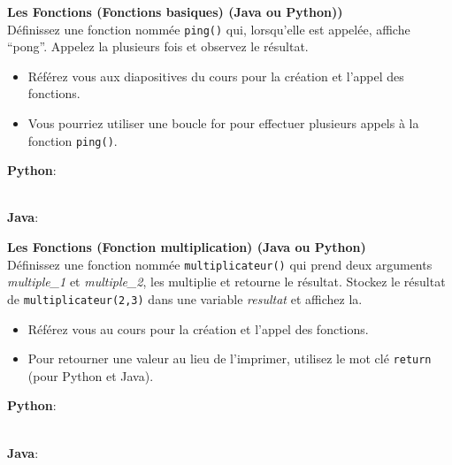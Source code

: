\begin{Exercice}[5 minutes] \textbf{Les Fonctions (Fonctions basiques) (Java ou Python))}\\
  Définissez une fonction nommée \lstinline{ping()} qui, lorsqu'elle est appelée, affiche ``pong''. Appelez la plusieurs fois et observez le résultat.  \\
   
    \begin{conseil}
        \begin{itemize}
            \item Référez vous aux diapositives du cours pour la création et l'appel des fonctions. 
            \item Vous pourriez utiliser une boucle for pour effectuer plusieurs appels à la fonction \lstinline{ping()}.
        \end{itemize}        
    \end{conseil}
    \begin{solution}
    
        \textbf{Python}:
        
        
        \textbf{\\Java}:
        
           
    \end{solution}   
\end{Exercice}

\begin{Exercice}[5 minutes] \textbf{Les Fonctions (Fonction multiplication) (Java ou Python)}\\
   Définissez une fonction nommée \lstinline{multiplicateur()} qui prend deux arguments \textit{multiple\_1} et \textit{multiple\_2}, les multiplie et retourne le résultat. Stockez le résultat de \lstinline{multiplicateur(2,3)} dans une variable \textit{resultat} et affichez la.   \\
   
    \begin{conseil}
        \begin{itemize}
            \item Référez vous au cours pour la création et l'appel des fonctions.
            \item Pour retourner une valeur au lieu de l'imprimer, utilisez le mot clé \lstinline{return} (pour Python et Java).
        \end{itemize}        
    \end{conseil}
    \begin{solution}
        \textbf{Python}:
        
        
        \textbf{\\Java}:
        
    \end{solution}   
\end{Exercice}

